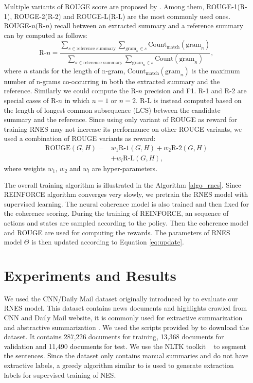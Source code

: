 \documentclass[letterpaper]{article} %
\begin{document}
	Multiple variants of ROUGE score are proposed by \cite{rouge}. Among them, ROUGE-1(R-1), ROUGE-2(R-2) and ROUGE-L(R-L) are the most commonly used ones. ROUGE-$n$(R-$n$) recall between an extracted summary and a reference summary can by computed as follows:
	\[ \text{R-}n = \frac{\sum_{s\in\text{reference summary}} \sum_{\text{gram}_n \in s} \text{Count}_{\text{match}} (\text{gram}_n) }{\sum_{s\in\text{reference summary}} \sum_{\text{gram}_n \in s} \text{Count} (\text{gram}_n)} , \]
	where $n$ stands for the length of n-gram, $\text{Count}_{\text{match}} (\text{gram}_n)$ is the maximum number of n-grams co-occurring in both the extracted summary and the reference. Similarly we could compute the R-$n$ precision and F1. R-1 and R-2 are special cases of R-$n$ in which $n=1$ or $n=2$. R-L is instead computed based on the length of longest common subsequence (LCS) between the candidate summary and the reference. Since using only variant of ROUGE as reward for training RNES may not increase its performance on other ROUGE variants, we used a combination of ROUGE variants as reward:
	\begin{align*}
	\text{ROUGE}(G, H) = & w_1 \text{R-1}(G, H) + w_2 \text{R-2}(G, H) \\
	& + w_l \text{R-L}(G, H),
	\end{align*}
	where weights $w_1$, $w_2$ and $w_l$ are hyper-parameters.

	The overall training algorithm is illustrated in the Algorithm \ref{algo_rnes}. Since REINFORCE algorithm converges very slowly, we pretrain the RNES model with supervised learning. The neural coherence model is also trained and then fixed for the coherence scoring. During the training of REINFORCE, an sequence of actions and states are sampled according to the policy. Then the coherence model and ROUGE are used for computing the rewards. The parameters of RNES model $\Theta$ is then updated according to Equation \ref{eq:update}. 
	
	
	\section{Experiments and Results}

	We used the CNN/Daily Mail dataset originally introduced by \cite{hermann_teaching_2015} to evaluate our RNES model. This dataset contains news documents and highlights crawled from CNN and Daily Mail website, it is commonly used for extractive summarization \cite{jianpeng2016,SummaRuNNer} and abstractive summarization \cite{nallapati_ramesh_abstractive_2016,see_get_2017}. We used the scripts provided by \cite{hermann_teaching_2015} to download the dataset. It contains 287,226 documents for training, 13,368 documents for validation and 11,490 documents for test. We use the NLTK toolkit ~\cite{nltk} to segment the sentences. Since the dataset only contains manual summaries and do not have extractive labels, a greedy algorithm similar to \cite{SummaRuNNer} is used to generate extraction labels for supervised training of NES.
	 
\end{document}
